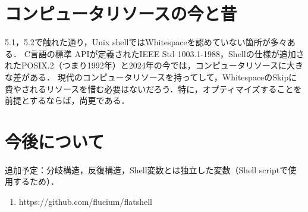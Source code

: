 \documentclass{article}
\begin{document}
\section{コンピュータリソースの今と昔}
5.1，5.2で触れた通り，Unix shellではWhitespaceを認めていない箇所が多々ある．\newline
C言語の標準 APIが定義されたIEEE Std 1003.1-1988，Shellの仕様が追加されたPOSIX.2（つまり1992年）と2024年の今では，コンピュータリソースに大きな差がある．\newline
現代のコンピュータリソースを持ってして，WhitespaceのSkipに費やされるリソースを惜む必要はないだろう．特に，オプティマイズすることを前提とするならば，尚更である．

\section{今後について}
追加予定：分岐構造，反復構造，Shell変数とは独立した変数（Shell scriptで使用するため）．



\begin{enumerate}
    \item https://github.com/flucium/flatshell
\end{enumerate}
\end{document}
